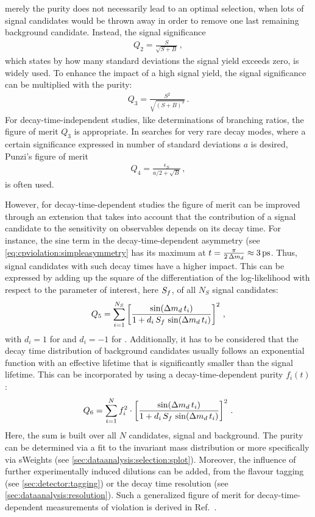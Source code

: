 merely the purity does not necessarily lead to an optimal selection, \eg when
lots of signal candidates would be thrown away in order to remove one last
remaining background candidate. Instead, the signal significance
\begin{align}
	Q_2 = \frac{S}{\sqrt{S + B}}\,,
\end{align}
which states by how many standard deviations the signal yield exceeds zero, is
widely used. To enhance the impact of a high signal yield, the signal
significance can be multiplied with the purity:
\begin{align}
	Q_3 = \frac{S^2}{\sqrt{(S + B)^3}}\,.
\end{align}
For decay-time-independent studies, like determinations of branching ratios,
the figure of merit $Q_3$ is appropriate. In searches for very rare decay
modes, where a certain significance expressed in number of standard deviations
$a$ is desired, Punzi's figure of merit~\cite{Punzi:2003bu}
\begin{align}
	Q_4 = \frac{\epsilon_S}{a/2 + \sqrt{B}}\,,
\end{align}
is often used.

However, for decay-time-dependent studies the figure of merit can be improved
through an extension that takes into account that the contribution of a signal
candidate to the sensitivity on \CP observables depends on its decay time. For
instance, the sine term in the decay-time-dependent asymmetry (see
\cref{eq:cpviolation:simpleasymmetry} has its maximum at $t =
\frac{\pi}{2\,\dmd} \approx \SI{3}{\ps}$. Thus, signal candidates with such
decay times have a higher impact. This can be expressed by adding up the
square of the differentiation of the log-likelihood with respect to the
parameter of interest, here $S_{f}$, of all $N_S$ signal candidates:
\begin{align}
	Q_5 = \sum_{i=1}^{N_S} \left[\frac{\sin({\Delta m_{{d}}}\,t_i)}{1 + d_i\,S_f\,\sin({\Delta m_{{d}}}\,t_i)}\right]^2\,,
\end{align}
with $d_i = \num{+1}$ for \Bd and $d_i = \num{-1}$ for \Bdb. Additionally, it
has to be considered that the decay time distribution of background candidates
usually follows an exponential function with an effective lifetime that is
significantly smaller than the \Bd signal lifetime. This can be incorporated
by using a decay-time-dependent purity $f_i(t)$:
\begin{align}
	Q_6 = \sum_{i=1}^{N} f_i^2 \cdot \left[\frac{\sin({\Delta m_{{d}}}\,t_i)}{1 + d_i\,S_f\,\sin({\Delta m_{{d}}}\,t_i)}\right]^2\,.
\end{align}
Here, the sum is built over all $N$ candidates, signal and background. The
purity can be determined via a fit to the invariant mass distribution or more
specifically via sWeights (see \cref{sec:dataanalysis:selection:splot}).
Moreover, the influence of further experimentally induced dilutions can be
added, \eg from the flavour tagging (see \cref{sec:detector:tagging})
or the decay time resolution (see \cref{sec:dataanalysis:resolution}). Such a
generalized figure of merit for decay-time-dependent measurements of
\CP violation is derived in Ref.~\cite{FOM}.